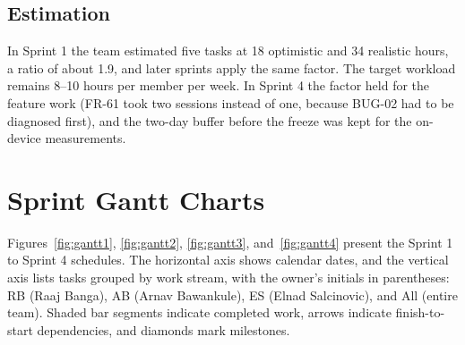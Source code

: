 \documentclass[12pt,letterpaper]{article}
\begin{document}
\subsection{Estimation}
In Sprint 1 the team estimated five tasks at 18 optimistic and 34 realistic hours, a
ratio of about 1.9, and later sprints apply the same factor. The target workload
remains 8--10 hours per member per week. In Sprint 4 the factor held for the
feature work (FR-61 took two sessions instead of one, because BUG-02 had to be
diagnosed first), and the two-day buffer before the freeze was kept for the
on-device measurements.

\section{Sprint Gantt Charts}
Figures~\ref{fig:gantt1}, \ref{fig:gantt2}, \ref{fig:gantt3}, and~\ref{fig:gantt4}
present the Sprint 1 to Sprint 4 schedules. The horizontal axis shows calendar dates, and the vertical axis lists tasks
grouped by work stream, with the owner's initials in parentheses: RB (Raaj Banga), AB
(Arnav Bawankule), ES (Elnad Salcinovic), and All (entire team). Shaded bar segments
indicate completed work, arrows indicate finish-to-start dependencies, and diamonds
mark milestones.
\end{document}
